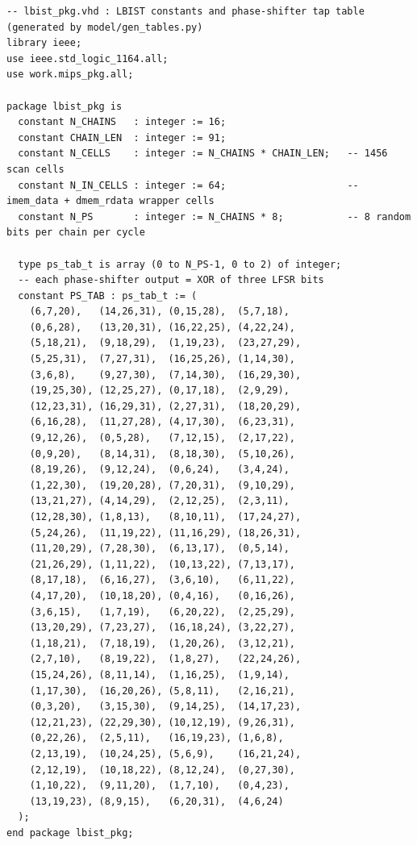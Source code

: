 \documentclass[conference]{IEEEtran}
\begin{document}
\begin{lstlisting}[style=vhdlstyle, caption={LBIST Package Definitions (\texttt{lbist\_pkg.vhd})}]
-- lbist_pkg.vhd : LBIST constants and phase-shifter tap table (generated by model/gen_tables.py)
library ieee;
use ieee.std_logic_1164.all;
use work.mips_pkg.all;

package lbist_pkg is
  constant N_CHAINS   : integer := 16;
  constant CHAIN_LEN  : integer := 91;
  constant N_CELLS    : integer := N_CHAINS * CHAIN_LEN;   -- 1456 scan cells
  constant N_IN_CELLS : integer := 64;                     -- imem_data + dmem_rdata wrapper cells
  constant N_PS       : integer := N_CHAINS * 8;           -- 8 random bits per chain per cycle

  type ps_tab_t is array (0 to N_PS-1, 0 to 2) of integer;
  -- each phase-shifter output = XOR of three LFSR bits
  constant PS_TAB : ps_tab_t := (
    (6,7,20),   (14,26,31), (0,15,28),  (5,7,18),
    (0,6,28),   (13,20,31), (16,22,25), (4,22,24),
    (5,18,21),  (9,18,29),  (1,19,23),  (23,27,29),
    (5,25,31),  (7,27,31),  (16,25,26), (1,14,30),
    (3,6,8),    (9,27,30),  (7,14,30),  (16,29,30),
    (19,25,30), (12,25,27), (0,17,18),  (2,9,29),
    (12,23,31), (16,29,31), (2,27,31),  (18,20,29),
    (6,16,28),  (11,27,28), (4,17,30),  (6,23,31),
    (9,12,26),  (0,5,28),   (7,12,15),  (2,17,22),
    (0,9,20),   (8,14,31),  (8,18,30),  (5,10,26),
    (8,19,26),  (9,12,24),  (0,6,24),   (3,4,24),
    (1,22,30),  (19,20,28), (7,20,31),  (9,10,29),
    (13,21,27), (4,14,29),  (2,12,25),  (2,3,11),
    (12,28,30), (1,8,13),   (8,10,11),  (17,24,27),
    (5,24,26),  (11,19,22), (11,16,29), (18,26,31),
    (11,20,29), (7,28,30),  (6,13,17),  (0,5,14),
    (21,26,29), (1,11,22),  (10,13,22), (7,13,17),
    (8,17,18),  (6,16,27),  (3,6,10),   (6,11,22),
    (4,17,20),  (10,18,20), (0,4,16),   (0,16,26),
    (3,6,15),   (1,7,19),   (6,20,22),  (2,25,29),
    (13,20,29), (7,23,27),  (16,18,24), (3,22,27),
    (1,18,21),  (7,18,19),  (1,20,26),  (3,12,21),
    (2,7,10),   (8,19,22),  (1,8,27),   (22,24,26),
    (15,24,26), (8,11,14),  (1,16,25),  (1,9,14),
    (1,17,30),  (16,20,26), (5,8,11),   (2,16,21),
    (0,3,20),   (3,15,30),  (9,14,25),  (14,17,23),
    (12,21,23), (22,29,30), (10,12,19), (9,26,31),
    (0,22,26),  (2,5,11),   (16,19,23), (1,6,8),
    (2,13,19),  (10,24,25), (5,6,9),    (16,21,24),
    (2,12,19),  (10,18,22), (8,12,24),  (0,27,30),
    (1,10,22),  (9,11,20),  (1,7,10),   (0,4,23),
    (13,19,23), (8,9,15),   (6,20,31),  (4,6,24)
  );
end package lbist_pkg;
\end{lstlisting}
\end{document}
